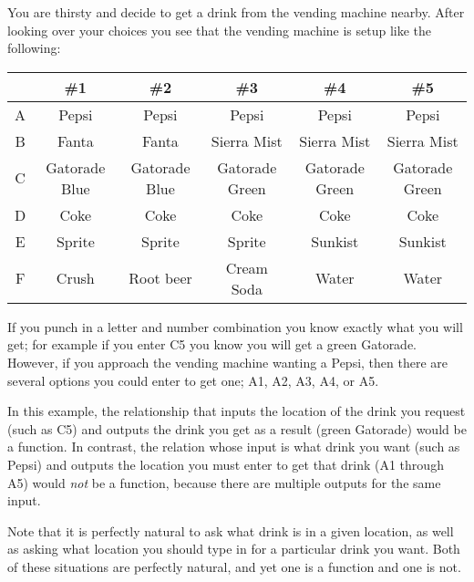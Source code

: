 \documentclass{ximera}
\begin{document}
    \begin{explanation}%
        You are thirsty and decide to get a drink from the vending machine nearby. After looking over your choices you see that the vending machine is setup like the following:
    
        \begin{tabular}{c|ccccc}
                & \#1           & \#2           & \#3           & \#4           & \#5           \\ \hline
            A   & Pepsi         & Pepsi         & Pepsi         & Pepsi         & Pepsi         \\
            B   & Fanta         & Fanta         & Sierra Mist   & Sierra Mist   & Sierra Mist   \\
            C   & Gatorade Blue & Gatorade Blue & Gatorade Green& Gatorade Green& Gatorade Green\\
            D   & Coke          & Coke          & Coke          & Coke          & Coke          \\
            E   & Sprite        & Sprite        & Sprite        & Sunkist       & Sunkist       \\
            F   & Crush         & Root beer     & Cream Soda    & Water         & Water         \\
        \end{tabular}
    
        If you punch in a letter and number combination you know exactly what you will get; for example if you enter C5 you know you will get a green Gatorade. However, if you approach the vending machine wanting a Pepsi, then there are several options you could enter to get one; A1, A2, A3, A4, or A5.
        
        In this example, the relationship that inputs the location of the drink you request (such as C5) and outputs the drink you get as a result (green Gatorade) would be a function. In contrast, the relation whose input is what drink you want (such as Pepsi) and outputs the location you must enter to get that drink (A1 through A5) would \textit{not} be a function, because there are multiple outputs for the same input.
        
        Note that it is perfectly natural to ask what drink is in a given location, as well as asking what location you should type in for a particular drink you want. Both of these situations are perfectly natural, and yet one is a function and one is not.
    
    \end{explanation}%
    
\end{document}
